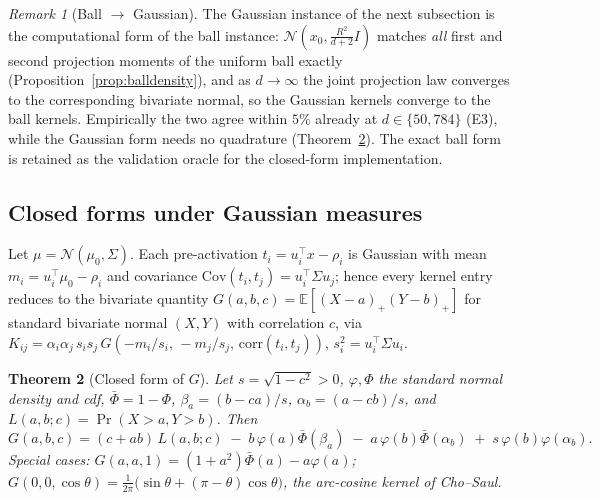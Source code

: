 \documentclass[11pt]{article}
\newtheorem{theorem}{Theorem}[section]
\theoremstyle{remark}
\newtheorem{remark}[theorem]{Remark}
\newcommand{\E}{\mathbb{E}}
\begin{document}
\begin{remark}[Ball $\to$ Gaussian]\label{rem:balltogauss}
The Gaussian instance of the next subsection is the computational form of
the ball instance: $\mathcal N(x_0, \tfrac{R^2}{d+2} I)$ matches \emph{all}
first and second projection moments of the uniform ball exactly
(Proposition~\ref{prop:balldensity}), and as $d \to \infty$ the joint
projection law converges to the corresponding bivariate normal, so the
Gaussian kernels converge to the ball kernels. Empirically the two agree
within $5\%$ already at $d \in \{50, 784\}$ (E3), while the Gaussian form
needs no quadrature (Theorem~\ref{thm:G}). The exact ball form is retained
as the validation oracle for the closed-form implementation.
\end{remark}

\subsection{Closed forms under Gaussian measures}

Let $\mu = \mathcal N(\mu_0, \Sigma)$. Each pre-activation
$t_i = u_i^\top x - \rho_i$ is Gaussian with mean
$m_i = u_i^\top \mu_0 - \rho_i$ and covariance
$\mathrm{Cov}(t_i,t_j) = u_i^\top \Sigma u_j$; hence every kernel entry
reduces to the bivariate quantity
$G(a,b,c) = \E[(X-a)_+(Y-b)_+]$ for standard bivariate normal $(X,Y)$ with
correlation $c$, via
$K_{ij} = \alpha_i\alpha_j\, s_i s_j\, G(-m_i/s_i,\, -m_j/s_j,\,
\mathrm{corr}(t_i,t_j))$, $s_i^2 = u_i^\top\Sigma u_i$.

\begin{theorem}[Closed form of $G$]\label{thm:G}
Let $s = \sqrt{1-c^2} > 0$, $\varphi,\Phi$ the standard normal density and
cdf, $\bar\Phi = 1-\Phi$, $\beta_a = (b-ca)/s$, $\alpha_b = (a-cb)/s$, and
$L(a,b;c) = \Pr(X>a, Y>b)$. Then
\[
  G(a,b,c) = (c + ab)\, L(a,b;c)
  \;-\; b\,\varphi(a)\bar\Phi(\beta_a)
  \;-\; a\,\varphi(b)\bar\Phi(\alpha_b)
  \;+\; s\,\varphi(b)\varphi(\alpha_b).
\]
Special cases: $G(a,a,1) = (1+a^2)\bar\Phi(a) - a\varphi(a)$;
$G(0,0,\cos\theta) = \tfrac{1}{2\pi}\big(\sin\theta +
(\pi-\theta)\cos\theta\big)$, the arc-cosine kernel of Cho--Saul.
\end{theorem}
\end{document}
